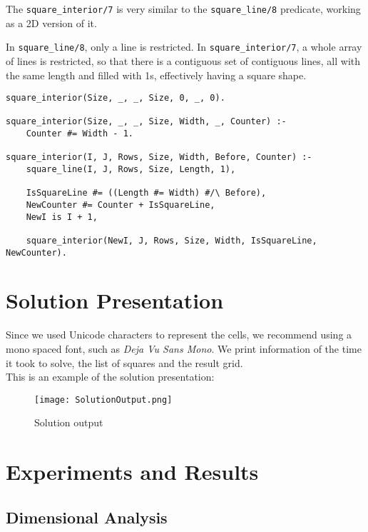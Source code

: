 \documentclass[runningheads]{llncs}
\begin{document}
The \texttt{square_interior/7} is very similar to the \texttt{square_line/8} predicate, working as a 2D version of it.

In \texttt{square_line/8}, only a line is restricted. In \texttt{square_interior/7}, a whole array of lines is restricted, so that there is a contiguous set of contiguous lines, all with the same length and filled with 1s, effectively having a square shape.

\begin{verbatim}
square_interior(Size, _, _, Size, 0, _, 0).

square_interior(Size, _, _, Size, Width, _, Counter) :-
    Counter #= Width - 1.

square_interior(I, J, Rows, Size, Width, Before, Counter) :-
    square_line(I, J, Rows, Size, Length, 1),

    IsSquareLine #= ((Length #= Width) #/\ Before),
    NewCounter #= Counter + IsSquareLine,
    NewI is I + 1,

    square_interior(NewI, J, Rows, Size, Width, IsSquareLine, NewCounter).
\end{verbatim}

\section{Solution Presentation}

Since we used Unicode characters to represent the cells, we recommend using a mono spaced font, such as \textit{Deja Vu Sans Mono}. We print information of the time it took to solve, the list of squares and the result grid.\\
This is an example of the solution presentation:

\begin{figure}[h!]
    \centering
    \texttt{[image: SolutionOutput.png]}
    \caption{Solution output}
    \label{fig:solution_output}
\end{figure}

\section{Experiments and Results}

\subsection{Dimensional Analysis}
\end{document}
